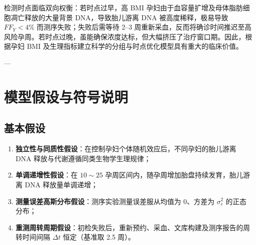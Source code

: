 \documentclass[11pt,a4paper]{article}
\begin{document}
检测时点面临双向权衡：若时点过早，高 BMI 孕妇由于血容量扩增及母体脂肪细胞凋亡释放的大量背景 DNA，导致胎儿游离 DNA 被高度稀释，极易导致 $FF_Y < 4\%$ 而测序失败；失败后需等待 2--3 周重新采血，反而将确诊时间推迟至高风险孕周。若时点过晚，虽能确保浓度达标，但大幅挤压了治疗窗口期。因此，根据孕妇 BMI 及生理指标建立科学的分组与时点优化模型具有重大的临床价值。

---

\section{模型假设与符号说明}

\subsection{基本假设}
\begin{enumerate}[leftmargin=*]
    \item \textbf{独立性与同质性假设}：在控制孕妇个体随机效应后，不同孕妇的胎儿游离 DNA 释放与代谢遵循同类生物学生理规律；
    \item \textbf{单调递增性假设}：在 $10 \sim 25$ 孕周区间内，随孕周增加胎盘持续发育，胎儿游离 DNA 释放量单调递增；
    \item \textbf{测量误差高斯分布假设}：测序实验测量误差服从均值为 0、方差为 $\sigma_e^2$ 的正态分布；
    \item \textbf{重测周转周期假设}：初检失败后，重新预约、采血、文库构建及测序报告的周转时间间隔 $\Delta t$ 恒定（基准取 2.5 周）。
\end{enumerate}
\end{document}
